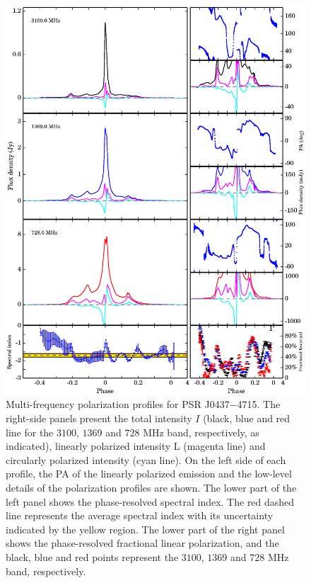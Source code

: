 \documentclass[useAMS,usenatbib]{mn2e}
\begin{document}
\begin{figure}
\begin{center}
\includegraphics[width=6 in]{0437.ps}
\caption{Multi-frequency polarization profiles for PSR J0437$-$4715. 
The right-side panels present the total intensity $I$ (black, blue and red
line for the $3100$, $1369$ and $728$ MHz band, respectively, as 
indicated), linearly polarized intensity L (magenta line) and circularly 
polarized intensity (cyan line).
%
On the left side of each profile, the PA of the linearly polarized 
emission and the low-level details of the polarization profiles are 
shown.
%
The lower part of the left panel shows the phase-resolved spectral index. 
The red dashed line represents the average spectral index with its uncertainty 
indicated by the yellow region.
%
The lower part of the right panel shows the phase-resolved fractional linear 
polarization, and the black, blue and red points represent the $3100$, $1369$ 
and $728$ MHz band, respectively. 
}
\label{0437}
\end{center}
\end{figure}
\end{document}
